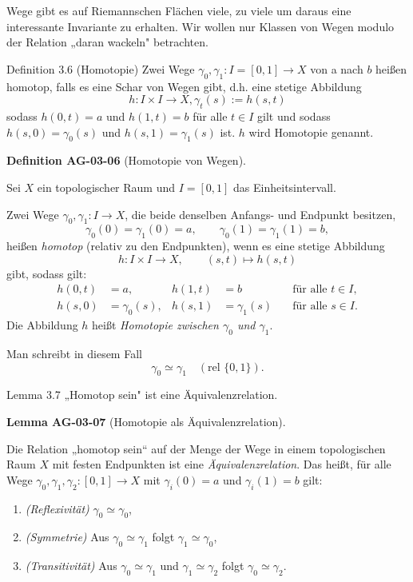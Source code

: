\documentclass[10pt, letterpaper]{article}
\newcommand{\CustomHeading}[3]{%
  \par\medskip\noindent%
  \textbf{#1 #2} \textnormal{(#3)}.\enskip%
}
\newenvironment{DEF}[2]{\begin{unitbox}\CustomHeading{Definition}{#1}{#2}}{\end{unitbox}}
\newenvironment{LEM}[2]{\begin{unitbox}\CustomHeading{Lemma}{#1}{#2}}{\end{unitbox}}
\begin{document}
Wege gibt es auf Riemannschen Flächen viele, zu viele um daraus eine interessante Invariante zu erhalten. Wir wollen nur Klassen von Wegen modulo der Relation „daran wackeln" betrachten.

Definition 3.6 (Homotopie) Zwei Wege $\gamma_{0}, \gamma_{1}: I=[0,1] \rightarrow X$ von a nach $b$ heißen homotop, falls es eine Schar von Wegen gibt, d.h. eine stetige Abbildung
$$
h: I \times I \rightarrow X, \gamma_{t}(s):=h(s, t)
$$
sodass $h(0, t)=a$ und $h(1, t)=b$ für alle $t \in I$ gilt und sodass $h(s, 0)=\gamma_{0}(s)$ und $h(s, 1)=\gamma_{1}(s)$ ist. $h$ wird Homotopie genannt.


\begin{DEF}{AG-03-06}{Homotopie von Wegen}
Sei \(X\) ein topologischer Raum und \(I=[0,1]\) das Einheitsintervall.

\medskip
\noindent
Zwei Wege \(\gamma_0,\gamma_1:I\to X\), die beide denselben Anfangs- und Endpunkt besitzen,
\[
\gamma_0(0)=\gamma_1(0)=a, \qquad \gamma_0(1)=\gamma_1(1)=b,
\]
heißen \emph{homotop} (relativ zu den Endpunkten),
wenn es eine stetige Abbildung
\[
h:I\times I\longrightarrow X,\qquad (s,t)\longmapsto h(s,t)
\]
gibt, sodass gilt:
\[
\begin{aligned}
h(0,t)&=a, & h(1,t)&=b \quad &\text{für alle } t\in I,\\
h(s,0)&=\gamma_0(s), & h(s,1)&=\gamma_1(s) \quad &\text{für alle } s\in I.
\end{aligned}
\]
Die Abbildung \(h\) heißt \emph{Homotopie zwischen \(\gamma_0\) und \(\gamma_1\)}.

\medskip
\noindent
Man schreibt in diesem Fall
\[
\gamma_0 \simeq \gamma_1 \quad (\text{rel } \{0,1\}).
\]
\end{DEF}


Lemma 3.7 „Homotop sein" ist eine Äquivalenzrelation.

\begin{LEM}{AG-03-07}{Homotopie als Äquivalenzrelation}
Die Relation „homotop sein“ auf der Menge der Wege in einem topologischen Raum \(X\)
mit festen Endpunkten ist eine \emph{Äquivalenzrelation}.
\medskip
\noindent
Das heißt, für alle Wege \(\gamma_0,\gamma_1,\gamma_2:[0,1]\to X\) mit
\(\gamma_i(0)=a\) und \(\gamma_i(1)=b\) gilt:
\begin{enumerate}
  \item \emph{(Reflexivität)} \(\gamma_0 \simeq \gamma_0\),
  \item \emph{(Symmetrie)} Aus \(\gamma_0 \simeq \gamma_1\) folgt \(\gamma_1 \simeq \gamma_0\),
  \item \emph{(Transitivität)} Aus \(\gamma_0 \simeq \gamma_1\) und \(\gamma_1 \simeq \gamma_2\)
        folgt \(\gamma_0 \simeq \gamma_2\).
\end{enumerate}
\end{LEM}
\end{document}

